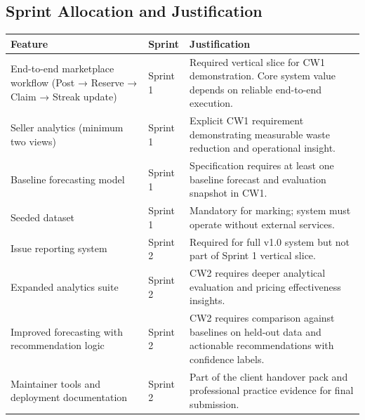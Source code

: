 \documentclass[11pt, a4paper]{report}
\begin{document}
	\FloatBarrier
	
	\clearpage
	
	\subsection{Sprint Allocation and Justification}
	
	\renewcommand{\arraystretch}{1.3}
	
	\begin{table}[H]
		\centering
		\begin{tabular}{|p{4cm}|p{2cm}|p{8cm}|}
			\hline
			\textbf{Feature} & \textbf{Sprint} & \textbf{Justification} \\
			\hline
			
			End-to-end marketplace workflow (Post → Reserve → Claim → Streak update) &
			Sprint 1 &
			Required vertical slice for CW1 demonstration. Core system value depends on reliable end-to-end execution. \\
			\hline
			
			Seller analytics (minimum two views) &
			Sprint 1 &
			Explicit CW1 requirement demonstrating measurable waste reduction and operational insight. \\
			\hline
			
			Baseline forecasting model &
			Sprint 1 &
			Specification requires at least one baseline forecast and evaluation snapshot in CW1. \\
			\hline
			
			Seeded dataset &
			Sprint 1 &
			Mandatory for marking; system must operate without external services. \\
			\hline
			
			Issue reporting system &
			Sprint 2 &
			Required for full v1.0 system but not part of Sprint 1 vertical slice. \\
			\hline
			
			Expanded analytics suite &
			Sprint 2 &
			CW2 requires deeper analytical evaluation and pricing effectiveness insights. \\
			\hline
			
			Improved forecasting with recommendation logic &
			Sprint 2 &
			CW2 requires comparison against baselines on held-out data and actionable recommendations with confidence labels. \\
			\hline
			
			Maintainer tools and deployment documentation &
			Sprint 2 &
			Part of the client handover pack and professional practice evidence for final submission. \\
			\hline
			

\end{tabular}
\end{table}
\end{document}
